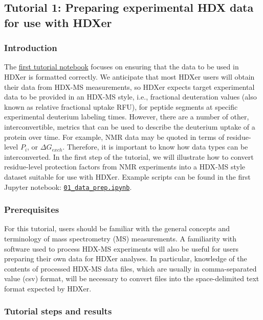 \documentclass[9pt,tutorial,ASAPversion]{livecoms}
\begin{document}
\subsection{Tutorial 1: Preparing experimental HDX data for use with HDXer}\label{tutorial_1}

\subsubsection{Introduction}
The \href{https://github.com/Lucy-Forrest-Lab/HDXer/blob/master/tutorials/notebooks/01_data_prep.ipynb}{first tutorial notebook} focuses on ensuring that the data to be used in HDXer is formatted correctly. 
We anticipate that most HDXer users will obtain their data from HDX-MS measurements, so HDXer expects target experimental data to be provided in an HDX-MS style, i.e., fractional deuteration values (also known as relative fractional uptake RFU), for peptide segments at specific experimental deuterium labeling times. 
However, there are a number of other, interconvertible, metrics that can be used to describe the deuterium uptake of a protein over time. 
For example, NMR data may be quoted in terms of residue-level $P_i$, or $\Delta{G_{exch}}$. 
Therefore, it is important to know how data types can be interconverted. 
In the first step of the tutorial, we will illustrate how to convert residue-level protection factors from NMR experiments into a HDX-MS style dataset suitable for use with HDXer. 
Example scripts can be found in the first Jupyter notebook: \href{https://github.com/Lucy-Forrest-Lab/HDXer/blob/master/tutorials/notebooks/01_data_prep.ipynb}{\texttt{01\_data\_prep.ipynb}}.

\subsubsection{Prerequisites}
For this tutorial, users should be familiar with the general concepts and terminology of mass spectrometry (MS) measurements. 
A familiarity with software used to process HDX-MS experiments will also be useful for users preparing their own data for HDXer analyses.
In particular, knowledge of the contents of processed HDX-MS data files, which are usually in comma-separated value (csv) format, will be necessary to convert files into the space-delimited text format expected by HDXer.

\subsubsection{Tutorial steps and results}
\end{document}
